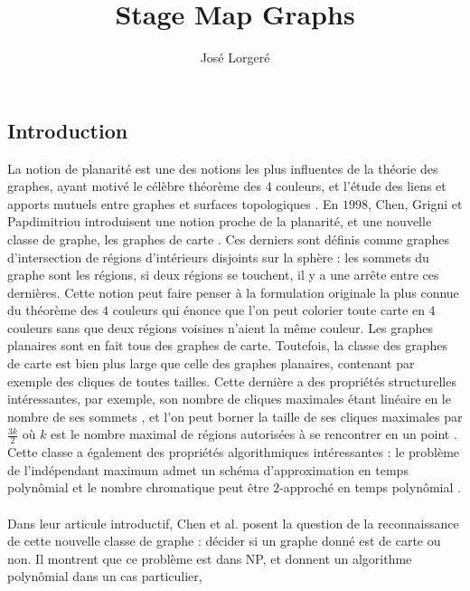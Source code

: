 \documentclass{scrartcl}
\begin{document}
\title{Stage Map Graphs}

\author{José Lorgeré}

\maketitle

\begin{flushleft}

\tableofcontents

\section*{Introduction}

La notion de planarité est une des notions les plus influentes de la théorie des graphes, ayant motivé le célèbre théorème des $4$ couleurs,
et l'étude des liens et apports mutuels entre graphes et surfaces topologiques \cite{face2conn}. En $1998$, Chen, Grigni et Papdimitriou
introduisent une notion proche de la planarité, et une nouvelle classe de graphe, les graphes de carte \cite{IntroMap}. Ces derniers
sont définis comme graphes d'intersection de régions d'intérieurs disjoints sur la sphère : les sommets du graphe sont les régions,
si deux régions se touchent, il y a une arrête entre ces dernières. Cette notion peut faire penser à la formulation originale la plus
connue du théorème des $4$ couleurs qui énonce que l'on peut colorier toute carte en $4$ couleurs sans que deux régions voisines
n'aient la même couleur. Les graphes planaires sont en fait tous des graphes de carte. Toutefois, la classe des graphes de carte
est bien plus large que celle des graphes planaires, contenant par exemple des cliques de toutes tailles. Cette dernière a des
propriétés structurelles intéressantes, par exemple, son nombre de cliques maximales étant linéaire en le nombre de ses sommets
\cite{IntroMap}, et l'on peut borner la taille de ses cliques maximales par $\frac{3k}{2}$ où $k$ est le nombre maximal de régions
autorisées à se rencontrer en un point \cite{IntroMap}. Cette classe a également des propriétés algorithmiques intéressantes :
le problème de l'indépendant maximum admet un schéma d'approximation en temps polynômial et le nombre chromatique
peut être $2$-approché en temps polynômial \cite{approxMap}.
\\~\\
Dans leur articule introductif, Chen et al. posent la question de la reconnaissance de cette nouvelle classe de graphe : décider si un
graphe donné est de carte ou non. Il montrent que ce problème est dans NP, et donnent un algorithme polynômial dans un cas particulier,

\end{flushleft}
\end{document}
